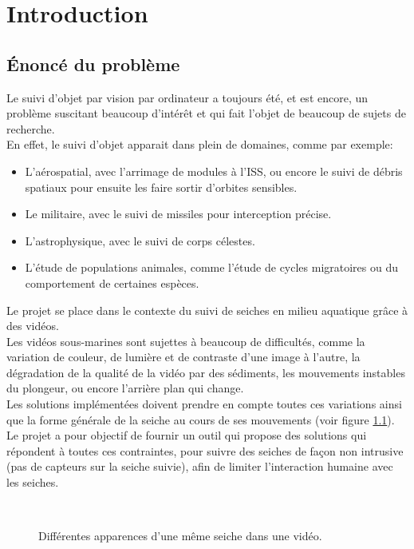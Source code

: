 \pagestyle{plain}
\chapter{Introduction}





\section{Énoncé du problème}
Le suivi d'objet par vision par ordinateur a toujours été, et est encore, un problème suscitant beaucoup d'intérêt et qui fait l'objet de beaucoup de sujets de recherche.\\
En effet, le suivi d'objet apparait dans plein de domaines, comme par exemple:
\begin{itemize}
	\item L'aérospatial, avec l'arrimage de modules à l'ISS, ou encore le suivi de débris spatiaux pour ensuite les faire sortir d'orbites sensibles.
	\item Le militaire, avec le suivi de missiles pour interception précise.
	\item L'astrophysique, avec le suivi de corps célestes.
	\item L'étude de populations animales, comme l'étude de cycles migratoires ou du comportement de certaines espèces.\\
\end{itemize}

Le projet se place dans le contexte du suivi de seiches en milieu aquatique grâce à des vidéos.\\
Les vidéos sous-marines sont sujettes à beaucoup de difficultés, comme la variation de couleur, de lumière et de contraste d'une image à l'autre, la dégradation de la qualité de la vidéo par des sédiments, les mouvements instables du plongeur, ou encore l'arrière plan qui change.\\
Les solutions implémentées doivent prendre en compte toutes ces variations ainsi que la forme générale de la seiche au cours de ses mouvements (voir figure \ref{fig:cuttlefish_variation}).\\
Le projet a pour objectif de fournir un outil qui propose des solutions qui répondent à toutes ces contraintes, pour suivre des seiches de façon non intrusive (pas de capteurs sur la seiche suivie), afin de limiter l'interaction humaine avec les seiches.

\begin{figure}[!htbp]
\center
	\hspace{0.5cm}
	\\
	\hspace{0.5cm}
\caption{Différentes apparences d'une même seiche dans une vidéo.}
\label{fig:cuttlefish_variation}
\end{figure}
\FloatBarrier
\clearpage





